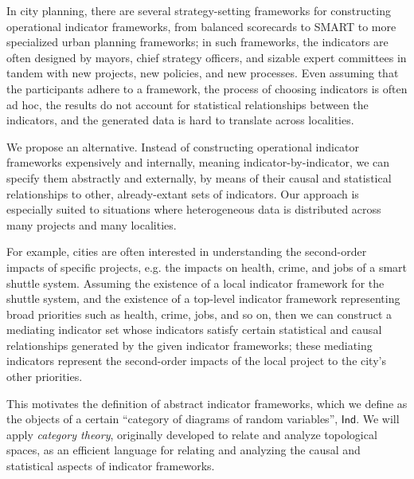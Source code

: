 \documentclass[sigconf]{acmart}
\newcommand{\Cat}[1]{\mathsf{#1}}
\def\Ind{\Cat{Ind}}
\begin{document}
In city planning, there are several strategy-setting frameworks for constructing operational indicator frameworks, from balanced scorecards \cite{epstein1997balanced} to SMART \cite{doran1981there} to more specialized urban planning frameworks; in such frameworks, the indicators are often designed by mayors, chief strategy officers, and sizable expert committees in tandem with new projects, new policies, and new processes. Even assuming that the participants adhere to a framework, the process of choosing indicators is often ad hoc, the results do not account for statistical relationships between the indicators, and the generated data is hard to translate across localities.

We propose an alternative. Instead of constructing operational indicator frameworks expensively and internally, meaning indicator-by-indicator, we can specify them abstractly and externally, by means of their causal and statistical relationships to other, already-extant sets of indicators. Our approach is especially suited to situations where heterogeneous data is distributed across many projects and many localities.

For example, cities are often interested in understanding the second-order impacts of specific projects, e.g. the impacts on health, crime, and jobs of a smart shuttle system. Assuming the existence of a local indicator framework for the shuttle system, and the existence of a top-level indicator framework representing broad priorities such as health, crime, jobs, and so on, then we can construct a mediating indicator set whose indicators satisfy certain statistical and causal relationships generated by the given indicator frameworks; these mediating indicators represent the second-order impacts of the local project to the city's other priorities.

This motivates the definition of abstract indicator frameworks, which we define as the objects of a certain ``category of diagrams of random variables'', $\Ind$. We will apply \emph{category theory}, originally developed to relate and analyze topological spaces, as an efficient language for relating and analyzing the causal and statistical aspects of indicator frameworks.

\end{document}
